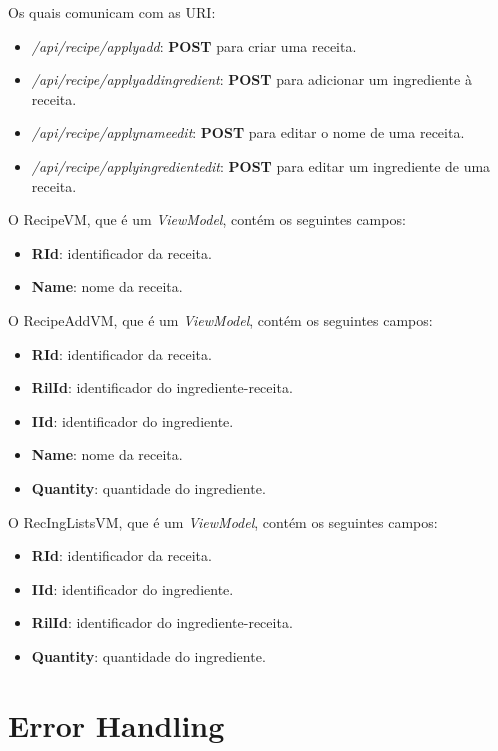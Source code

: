 Os quais comunicam com as URI:

\begin{itemize}
  \item \textit{/api/recipe/applyadd}: \textbf{POST} para criar uma receita.
  \item \textit{/api/recipe/applyaddingredient}: \textbf{POST} para adicionar um
  ingrediente à receita.
  \item \textit{/api/recipe/applynameedit}: \textbf{POST} para editar o nome de
  uma receita.
  \item \textit{/api/recipe/applyingredientedit}: \textbf{POST} para editar um
  ingrediente de uma receita.
\end{itemize}

O RecipeVM, que é um \textit{ViewModel}, contém os seguintes campos:

\begin{itemize}
  \item \textbf{RId}: identificador da receita.
  \item \textbf{Name}: nome da receita.
\end{itemize}

O RecipeAddVM, que é um \textit{ViewModel}, contém os seguintes campos:

\begin{itemize}
  \item \textbf{RId}: identificador da receita.
  \item \textbf{RilId}: identificador do ingrediente-receita.
  \item \textbf{IId}: identificador do ingrediente.
  \item \textbf{Name}: nome da receita.
  \item \textbf{Quantity}: quantidade do ingrediente.
\end{itemize}

O RecIngListsVM, que é um \textit{ViewModel}, contém os seguintes campos:

\begin{itemize}
  \item \textbf{RId}: identificador da receita.
  \item \textbf{IId}: identificador do ingrediente.
  \item \textbf{RilId}: identificador do ingrediente-receita.
  \item \textbf{Quantity}: quantidade do ingrediente.
\end{itemize}


\section{Error Handling}

